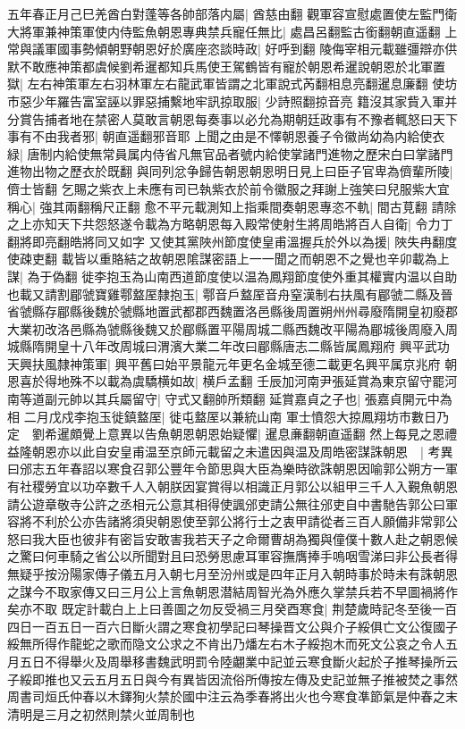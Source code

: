 五年春正月己巳羌酋白對蓬等各帥部落内屬|{
	酋慈由翻}
觀軍容宣慰處置使左監門衛大將軍兼神策軍使内侍監魚朝恩專典禁兵寵任無比|{
	處昌呂翻監古銜翻朝直遥翻}
上常與議軍國事勢傾朝野朝恩好於廣座恣談時政|{
	好呼到翻}
陵侮宰相元載雖彊辯亦供默不敢應神策都虞候劉希暹都知兵馬使王駕鶴皆有寵於朝恩希暹說朝恩於北軍置獄|{
	左右神策軍左右羽林軍左右龍武軍皆謂之北軍說式芮翻相息亮翻暹息廉翻}
使坊市惡少年羅告富室誣以罪惡捕繫地牢訊掠取服|{
	少詩照翻掠音亮}
籍沒其家貲入軍并分賞告捕者地在禁密人莫敢言朝恩每奏事以必允為期朝廷政事有不豫者輒怒曰天下事有不由我者邪|{
	朝直遥翻邪音耶}
上聞之由是不懌朝恩養子令徽尚幼為内給使衣緑|{
	唐制内給使無常員属内侍省凡無官品者號内給使掌諸門進物之歷宋白曰掌諸門進物出物之歷衣於既翻}
與同列忿争歸告朝恩朝恩明日見上曰臣子官卑為儕輩所陵|{
	儕士皆翻}
乞賜之紫衣上未應有司已執紫衣於前令徽服之拜謝上強笑曰兒服紫大宜稱心|{
	強其兩翻稱尺正翻}
愈不平元載測知上指乘間奏朝恩專恣不軌|{
	間古莧翻}
請除之上亦知天下共怨怒遂令載為方略朝恩每入殿常使射生將周皓將百人自衛|{
	令力丁翻將即亮翻皓將同又如字}
又使其黨陜州節度使皇甫溫握兵於外以為援|{
	陜失冉翻度使疎吏翻}
載皆以重賂結之故朝恩隂謀密語上一一聞之而朝恩不之覺也辛卯載為上謀|{
	為于偽翻}
徙李抱玉為山南西道節度使以温為鳳翔節度使外重其權實内温以自助也載又請割郿虢寶雞鄠盩厔隸抱玉|{
	鄠音戶盩厔音舟窒漢制右扶風有郿虢二縣及晉省虢縣存郿縣後魏於虢縣地置武都郡西魏置洛邑縣後周置朔州州尋廢隋開皇初廢郡大業初改洛邑縣為虢縣後魏又於郿縣置平陽周城二縣西魏改平陽為郿城後周廢入周城縣隋開皇十八年改周城曰渭濱大業二年改曰郿縣唐志二縣皆属鳳翔府}
興平武功天興扶風隸神策軍|{
	興平舊曰始平景龍元年更名金城至德二載更名興平属京兆府}
朝恩喜於得地殊不以載為虞驕横如故|{
	横戶孟翻}
壬辰加河南尹張延賞為東京留守罷河南等道副元帥以其兵屬留守|{
	守式又翻帥所類翻}
延賞嘉貞之子也|{
	張嘉貞開元中為相}
二月戊戍李抱玉徙鎮盩厔|{
	徙屯盩厔以兼統山南}
軍士憤怨大掠鳳翔坊市數日乃定　劉希暹頗覺上意異以告魚朝恩朝恩始疑懼|{
	暹息亷翻朝直遥翻}
然上每見之恩禮益隆朝恩亦以此自安皇甫温至京師元載留之未遣因與温及周皓密謀誅朝恩　|{
	考異曰邠志五年春詔以寒食召郭公豐年令節思與大臣為樂時欲誅朝恩因喻郭公朔方一軍有社稷勞宜以功卒數千人入朝朕因宴賞得以相識正月郭公以組甲三千人入覲魚朝恩請公遊章敬寺公許之丞相元公意其相得使諷邠吏請公無往邠吏自中書馳告郭公曰軍容將不利於公亦告諸將須臾朝恩使至郭公將行士之衷甲請從者三百人願備非常郭公怒曰我大臣也彼非有密旨安敢害我若天子之命爾曹胡為獨與僮僕十數人赴之朝恩候之驚曰何車騎之省公以所聞對且曰恐勞思慮耳軍容撫膺捧手嗚咽雪涕曰非公長者得無疑乎按汾陽家傳子儀五月入朝七月至汾州或是四年正月入朝時事於時未有誅朝恩之謀今不取家傳又曰三月公上言魚朝恩潜結周智光為外應久掌禁兵若不早圖禍將作矣亦不取}
既定計載白上上曰善圖之勿反受禍三月癸酉寒食|{
	荆楚歲時記冬至後一百四日一百五日一百六日斷火謂之寒食初學記曰琴操晋文公與介子綏俱亡文公復國子綏無所得作龍蛇之歌而隐文公求之不肯出乃燔左右木子綏抱木而死文公哀之令人五月五日不得舉火及周舉移書魏武明罰令陸翽業中記並云寒食斷火起於子推琴操所云子綏即推也又云五月五日與今有異皆因流俗所傳按左傳及史記並無子推被焚之事然周書司烜氏仲春以木鐸狥火禁於國中注云為季春將出火也今寒食凖節氣是仲春之末清明是三月之初然則禁火並周制也}
